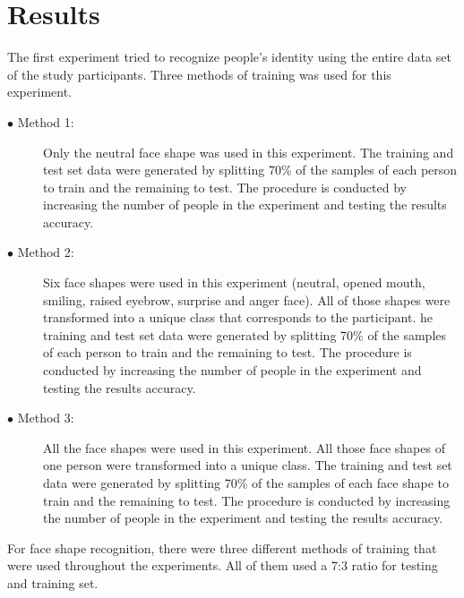 \documentclass[]{article}
\begin{document}
\section{Results}


The first experiment tried to recognize people's identity using the entire data
set of the study participants. Three methods of training was used for this
experiment.
\begin{description}
\item[$\bullet$ Method 1:]Only the neutral face shape was used in this
experiment.  The training and test set data were generated by splitting 70\% of
the samples of each person to train and the remaining to test. The procedure is
conducted by increasing the number of people in the experiment and testing the 
results accuracy.
\item[$\bullet$ Method 2:]Six face shapes were used in this experiment (neutral,
opened mouth, smiling, raised eyebrow, surprise and anger face). All of those
shapes were transformed into a unique class that corresponds to the participant.
he training and test set data were generated by splitting 70\% of the samples of
each person to train and the remaining to test. The procedure is conducted by
increasing the number of people in the experiment and testing the results
accuracy.
\item[$\bullet$ Method 3:]All the face shapes were used in this experiment. All
those face shapes of one person were transformed into a unique class. The
training and test set data were generated by splitting 70\% of the samples of
each face shape to train and the remaining to test. The procedure is conducted
by increasing the number of people in the experiment and testing the results
accuracy.
\end{description}

For face shape recognition, there were three different methods of training that
were used throughout the experiments. All of them used a 7:3 ratio for testing 
and training set.
\end{document}
